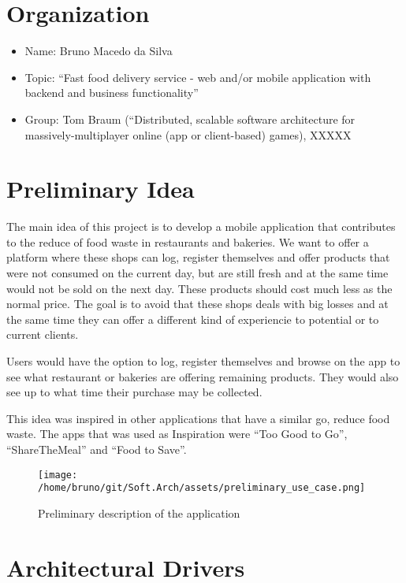 \documentclass[pdftex, a4paper]{scrartcl}
\begin{document}
\section{Organization}

\begin{itemize}
    \item Name: Bruno Macedo da Silva
    \item Topic: “Fast food delivery service - web and/or mobile application with backend and business functionality”
    \item Group: Tom Braum (“Distributed, scalable software architecture for massively-multiplayer online (app or 
    client-based) games), XXXXX
\end{itemize}

\section{Preliminary Idea}

The main idea of this project is to develop a mobile application that contributes to the reduce of food waste 
in restaurants and bakeries. We want to offer a platform where these shops can log, register themselves and offer
products that were not consumed on the current day, but are still fresh and at the same time would not be sold on 
the next day. These products should cost much less as the normal price. The goal is to avoid that these shops deals
with big losses and at the same time they can offer a different kind of experiencie to potential or to current clients.

Users would have the option to log, register themselves and browse on the app to see what restaurant or bakeries
are offering remaining products. They would also see up to what time their purchase may be collected.

This idea was inspired in other applications that have a similar go, reduce food waste. The apps that was used as Inspiration
were ``Too Good to Go'', ``ShareTheMeal'' and ``Food to Save''.

\begin{figure}[htb]
    \centering
    \texttt{[image: /home/bruno/git/Soft.Arch/assets/preliminary\_use\_case.png]}
    \caption{Preliminary description of the application}
    \label{fig:predes}
\end{figure}

\section{Architectural Drivers}
\end{document}
